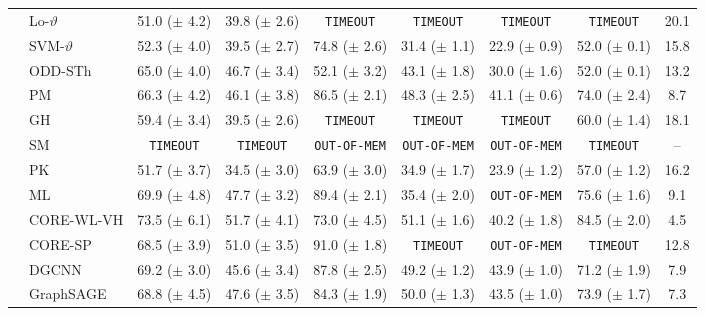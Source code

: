 \documentclass[twoside,11pt]{article}
\begin{document}
\begin{table}[t]
{\begin{tabular}{llccccccc}
& Lo-$\vartheta$ & 51.0 {\tiny ($\pm$ 4.2)} & 39.8 {\tiny ($\pm$ 2.6)} & \texttt{TIMEOUT} & \texttt{TIMEOUT} & \texttt{TIMEOUT} & \texttt{TIMEOUT} & 20.1 \\ 
& SVM-$\vartheta$ & 52.3 {\tiny ($\pm$ 4.0)} & 39.5 {\tiny ($\pm$ 2.7)} & 74.8 {\tiny ($\pm$ 2.6)} & 31.4 {\tiny ($\pm$ 1.1)} & 22.9 {\tiny ($\pm$ 0.9)} & 52.0 {\tiny ($\pm$ 0.1)} & 15.8 \\ 
& ODD-STh & 65.0 {\tiny ($\pm$ 4.0)} & 46.7 {\tiny ($\pm$ 3.4)} & 52.1 {\tiny ($\pm$ 3.2)} & 43.1 {\tiny ($\pm$ 1.8)} & 30.0 {\tiny ($\pm$ 1.6)} & 52.0 {\tiny ($\pm$ 0.1)} & 13.2 \\ 
& PM & 66.3 {\tiny ($\pm$ 4.2)} & 46.1 {\tiny ($\pm$ 3.8)} & 86.5 {\tiny ($\pm$ 2.1)} & 48.3 {\tiny ($\pm$ 2.5)} & 41.1 {\tiny ($\pm$ 0.6)} & 74.0 {\tiny ($\pm$ 2.4)} & 8.7 \\ 
& GH & 59.4 {\tiny ($\pm$ 3.4)} & 39.5 {\tiny ($\pm$ 2.6)} & \texttt{TIMEOUT} & \texttt{TIMEOUT} & \texttt{TIMEOUT} & 60.0 {\tiny ($\pm$ 1.4)} & 18.1 \\ 
& SM & \texttt{TIMEOUT} & \texttt{TIMEOUT} & \texttt{OUT-OF-MEM} & \texttt{OUT-OF-MEM} & \texttt{OUT-OF-MEM} & \texttt{TIMEOUT} & -- \\ 
& PK & 51.7 {\tiny ($\pm$ 3.7)} & 34.5 {\tiny ($\pm$ 3.0)} & 63.9 {\tiny ($\pm$ 3.0)} & 34.9 {\tiny ($\pm$ 1.7)} & 23.9 {\tiny ($\pm$ 1.2)} & 57.0 {\tiny ($\pm$ 1.2)} & 16.2 \\ 
& ML & 69.9 {\tiny ($\pm$ 4.8)} & 47.7 {\tiny ($\pm$ 3.2)} & 89.4 {\tiny ($\pm$ 2.1)} & 35.4 {\tiny ($\pm$ 2.0)} & \texttt{OUT-OF-MEM} & 75.6 {\tiny ($\pm$ 1.6)} & 9.1 \\ 
& CORE-WL-VH & 73.5 {\tiny ($\pm$ 6.1)} & 51.7 {\tiny ($\pm$ 4.1)} & 73.0 {\tiny ($\pm$ 4.5)} & 51.1 {\tiny ($\pm$ 1.6)} & 40.2 {\tiny ($\pm$ 1.8)} & 84.5 {\tiny ($\pm$ 2.0)} & 4.5 \\ 
& CORE-SP & 68.5 {\tiny ($\pm$ 3.9)} & 51.0 {\tiny ($\pm$ 3.5)} & 91.0 {\tiny ($\pm$ 1.8)} & \texttt{TIMEOUT} & \texttt{OUT-OF-MEM} & \texttt{TIMEOUT} & 12.8 \\ 
\midrule
\parbox[t]{2mm}{} & DGCNN & 69.2 {\tiny ($\pm$ 3.0)} & 45.6 {\tiny ($\pm$ 3.4)} & 87.8 {\tiny ($\pm$ 2.5)} & 49.2 {\tiny ($\pm$ 1.2)} & 43.9 {\tiny ($\pm$ 1.0)} & 71.2 {\tiny ($\pm$ 1.9)} & 7.9 \\ 
& GraphSAGE & 68.8 {\tiny ($\pm$ 4.5)} & 47.6 {\tiny ($\pm$ 3.5)} & 84.3 {\tiny ($\pm$ 1.9)} & 50.0 {\tiny ($\pm$ 1.3)} & 43.5 {\tiny ($\pm$ 1.0)} & 73.9 {\tiny ($\pm$ 1.7)} & 7.3 \\ 

\end{tabular}}
\end{table}
\end{document}
